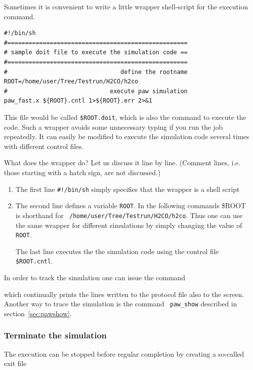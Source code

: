\documentclass[final,12pt]{article}
\begin{document}
Sometimes it is convenient to write a little wrapper shell-script for
the execution command.
\begin{verbatim}
#!/bin/sh
#===================================================
# sample doit file to execute the simulation code ==
#===================================================
#                                define the rootname 
ROOT=/home/user/Tree/Testrun/H2CO/h2co                               
#                             execute paw simulation
paw_fast.x ${ROOT}.cntl 1>${ROOT}.err 2>&1
\end{verbatim}
This file would be called {\tt \${ROOT}.doit}, which is
also the command to execute the code.  Such a wrapper avoids some
unnecessary typing if you run the job repeatedly. It can easily be
modified to execute the simulation code several times with different
control files.

What does the wrapper do? Let us discuss it line by line. (Comment
lines, i.e. those starting with a hatch sign, are not discussed.)
\begin{enumerate}
\item The first line {\tt \#!/bin/sh} simply specifies that the
  wrapper is a shell script
\item The second line defines a variable {\tt ROOT}. In the following
  commands \${ROOT} is shorthand for {\tt
  /home/user/Tree/Testrun/H2CO/h2co}. Thus one can use the same
  wrapper for different simulations by simply changing the value of
  {\tt ROOT}.
\begin{sloppypar}
  The last line executes the the simulation code using the control
  file {\tt \${ROOT}.cntl}. 
\end{sloppypar}
\end{enumerate}

In order to track the simulation one can issue the command

\bigskip{}\bigskip

which continually prints the lines written to the protocol file also
to the screen. Another way to trace the simulation is the command {\tt
paw\_show} described in section~\ref{sec:pawshow}.


\subsubsection{Terminate the simulation}

The execution can be stopped before regular completion by creating a
so-called exit file
\end{document}
